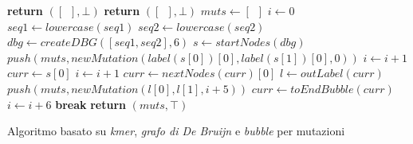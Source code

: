 \documentclass[a4paper,12pt, oneside]{book}
\begin{document}
\begin{algorithm}[H]
  \small
  \begin{algorithmic}[1]
    \State \textbf{return} $([\,\,\,],\bot)$
    \EndIf
    \State \textbf{return} $([\,\,\,],\bot)$
    \EndIf
    \State $muts \gets [\,\,\,]$
    \State $i\gets 0$
    \State $seq1\gets lowercase(seq1)$
    \State $seq2\gets lowercase(seq2)$
    \State $dbg\gets createDBG([seq1, seq2], 6)$
    \State $s \gets startNodes(dbg)$
    \State $push(muts, newMutation(label(s[0])[0], label(s[1])[0], 0))$ 
    \State $i\gets i+1$
    \EndIf
    \State $curr\gets s[0]$
    \While {$\top$}
    \State $i\gets i+1$
    \State $curr\gets nextNodes(curr)[0]$
    \Else
    \State $l\gets outLabel(curr)$
    \State $push(muts, newMutation(l[0], l[1], i+5))$
    \State $curr\gets toEndBubble(curr)$
    \State $i\gets i+6$
    \EndIf
    \State \textbf{break}
    \EndIf
    \EndWhile
    \State \textbf{return} $(muts, \top)$
    \EndFunction
  \end{algorithmic}
  \caption{Algoritmo basato su \textit{kmer}, \textit{grafo di De Bruijn} e
  \textit{bubble} per mutazioni} 
\end{algorithm}
\end{document}
